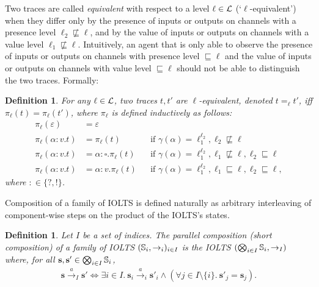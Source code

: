 \documentclass[preprint,5p,twocolumn]{elsarticle}
\newtheorem{definition}[theorem]{Definition}
\begin{document}
Two traces are called \emph{equivalent} with respect to a level $\ell \in \mathcal{L}$
(`$\ell$-equivalent') when they differ only by the presence of inputs or outputs on channels with
a presence level $\ell_2 \not\sqsubseteq \ell$, and by the value of inputs or outputs on channels
with a value level $\ell_1 \not\sqsubseteq \ell$. Intuitively, an agent that is only able to
observe the presence of inputs or outputs on channels with presence level $\sqsubseteq \ell$ and the value of
inputs or outputs on channels with value level $\sqsubseteq \ell$ should not be able to distinguish the two
traces. Formally:
\begin{definition}
  \label{def:projection}
  For any $\ell \in \mathcal{L}$, two traces $t,t'$ are $\ell$-equivalent, denoted $t =_\ell t'$, iff
  $\pi_\ell(t) = \pi_\ell(t')$, where $\pi_\ell$ is defined inductively as follows:
  \begin{align*}
    \pi_\ell(\varepsilon) &=  \varepsilon \\
    \pi_\ell(\alpha : v.t) &= \pi_\ell(t) & & \text{if } \gamma(\alpha)=\ell_1^{\ell_2}, \ell_2 \not\sqsubseteq \ell\\
    \pi_\ell(\alpha : v.t) &= \alpha : \square. \pi_\ell(t) & & \text{if } \gamma(\alpha)=\ell_1^{\ell_2}, \ell_1 \not\sqsubseteq \ell, \ell_2 \sqsubseteq \ell\\
    \pi_\ell(\alpha : v.t) &= \alpha : v . \pi_\ell(t) & & \text{if } \gamma(\alpha)=\ell_1^{\ell_2}, \ell_1\sqsubseteq \ell,\ell_2 \sqsubseteq \ell,
  \end{align*}
  where $: \in \{?,!\}$.
\end{definition}


Composition of a family of IOLTS is defined naturally as arbitrary interleaving of component-wise
steps on the product of the IOLTS's states.

\begin{definition}
  Let $I$ be a set of indices. The \emph{parallel composition} (short \emph{composition}) of a family of IOLTS $(\mathbb{S}_i,\rightarrow_i)_{i \in I}$ is the IOLTS $(\bigotimes_{i \in I} \mathbb{S}_i, \rightarrow_I)$ where, for all $\mathbf{s},\mathbf{s'} \in\bigotimes_{i \in I} \mathbb{S}_i$,
  \begin{align*}
\mathbf{s} \xrightarrow{a}_I \mathbf{s'} \Longleftrightarrow \exists i \in I.~\mathbf{s}_i \xrightarrow{a}_i \mathbf{s'}_i \land (\forall j \in I \setminus \{i\}.~\mathbf{s'}_j=\mathbf{s}_j).
  \end{align*}
\end{definition}
\end{document}
